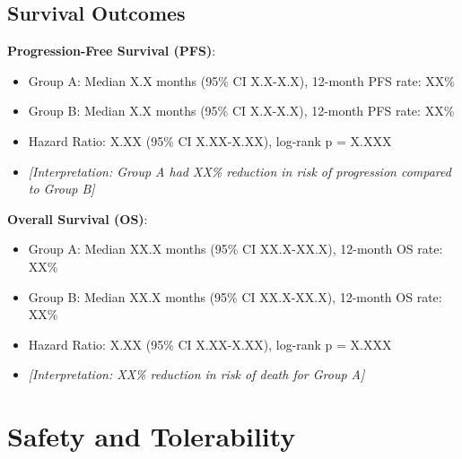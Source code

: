 \documentclass[10pt,letterpaper]{article}
\begin{document}
\subsection{Survival Outcomes}

\textbf{Progression-Free Survival (PFS)}:
\begin{itemize}
\item Group A: Median X.X months (95\% CI X.X-X.X), 12-month PFS rate: XX\%
\item Group B: Median X.X months (95\% CI X.X-X.X), 12-month PFS rate: XX\%
\item Hazard Ratio: X.XX (95\% CI X.XX-X.XX), log-rank p = X.XXX
\item \textit{[Interpretation: Group A had XX\% reduction in risk of progression compared to Group B]}
\end{itemize}

\textbf{Overall Survival (OS)}:
\begin{itemize}
\item Group A: Median XX.X months (95\% CI XX.X-XX.X), 12-month OS rate: XX\%
\item Group B: Median XX.X months (95\% CI XX.X-XX.X), 12-month OS rate: XX\%
\item Hazard Ratio: X.XX (95\% CI X.XX-X.XX), log-rank p = X.XXX
\item \textit{[Interpretation: XX\% reduction in risk of death for Group A]}
\end{itemize}


\section{Safety and Tolerability}
\end{document}
